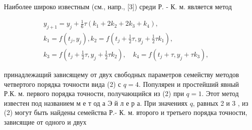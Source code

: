\documentclass[10pt]{article}
\begin{document}
Наиболее широко известным (см., напр., [3]) среди Р. - К. м. является метод



\[

\begin{gathered}

y_{j+1}=y_{j}+\frac{1}{6} \tau\left(k_{1}+2 k_{2}+2 k_{3}+k_{4}\right), \\

k_{1}=f\left(t_{j}, y_{j}\right), k_{2}=f\left(t_{j}+\frac{1}{2} \tau, y_{j}+\frac{1}{2} \tau k_{1}\right), \\

k_{3}=f\left(t_{j}+\frac{1}{2} \tau, y_{j}+\frac{1}{2} \tau k_{2}\right), \quad k_{4}=f\left(t_{j}+\tau, y_{j}+\tau k_{3}\right),

\end{gathered}

\]



принадлежащий зависящему от двух свободных параметров семейству методов четвертого порядка точности вида (2) с $q=4$. Популярен и простейший явный Р.К. м. первого порядка точности, получающийся из (2) при $q=1$. Этот метод известен под названием м е т од а Э й л е р а. При значениях $q$, равных 2 и 3 , из (2) могут быть найдены семейства Р.- К. м. второго и третьего порядка точности, зависящие от одного и двух
\end{document}
